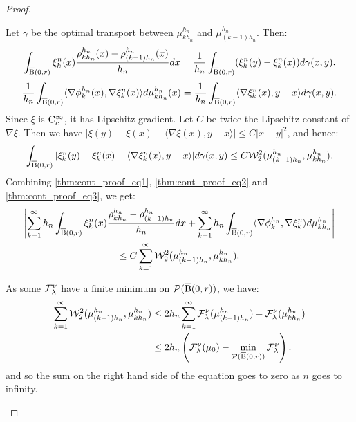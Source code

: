\begin{proof}
\begin{enumerate}[wide, labelwidth=!, labelindent=0pt,label=(\arabic*)]
Let $\gamma$ be the optimal transport between $\mu_{kh_n}^{h_n}$ and $\mu_{(k-1)h_n}^{h_n}$. Then:
\begin{equation} \label{thm:cont_proof_eq1}
\int_{\operatorname{\overline{B}}(0,r)} \xi_k^n(x) \frac{\rho_{kh_n}^{h_n}(x) - \rho_{(k-1)h_n}^{h_n}(x)}{h_n} dx = \frac{1}{h_n} \int_{\operatorname{\overline{B}}(0,r)} (\xi_k^n(y) - \xi_k^n(x)) d\gamma(x,y).
\end{equation}
\begin{equation} \label{thm:cont_proof_eq2}
\frac{1}{h_n}\int_{\operatorname{\overline{B}}(0,r)} \langle \nabla \phi_k^{h_n}(x) , \nabla \xi_k^n(x) \rangle d\mu_{kh_n}^{h_n}(x)  = \frac{1}{h_n} \int_{\operatorname{\overline{B}}(0,r)} \langle \nabla \xi_k^n(x), y-x \rangle d\gamma(x,y). 
\end{equation}
Since $\xi$ is $\mathrm{C}_c^{\infty}$, it has Lipschitz gradient. Let $C$ be twice the Lipschitz constant of $\nabla \xi$. Then we have $| \xi(y) - \xi(x) - \langle \nabla \xi(x), y-x \rangle | \leq C|x- y|^2$, and hence:
\begin{equation} \label{thm:cont_proof_eq3}
\int_{\operatorname{\overline{B}}(0,r)} |\xi_k^n(y) - \xi_k^n(x) - \langle \nabla \xi_k^n(x), y-x \rangle | d \gamma(x,y) \leq C{\cal W}_2^2( \mu_{(k-1)h_n}^{h_n}, \mu_{kh_n}^{h_n}).
\end{equation}
Combining \eqref{thm:cont_proof_eq1}, \eqref{thm:cont_proof_eq2} and \eqref{thm:cont_proof_eq3}, we get:
\begin{multline} \label{thm:cont_proof_eq4}
\left|\sum_{k=1}^{\infty} h_n \int_{\operatorname{\overline{B}}(0,r)} \xi_k^n(x) \frac{\rho_{kh_n}^{h_n} - \rho_{(k-1)h_n}^{h_n}}{h_n} dx  + 
\sum_{k=1}^{\infty} h_n\int_{\operatorname{\overline{B}}(0,r)} \langle \nabla \phi_k^{h_n} , \nabla \xi_k^n \rangle d\mu_{kh_n}^{h_n} \right| \\
\leq C\sum_{k=1}^{\infty} {\cal W}_2^2(\mu_{(k-1)h_n}^{h_n}, \mu_{kh_n}^{h_n}).
\end{multline}

As  some $\mathcal{F}^{\nu}_{\lambda}$ have a finite minimum on $\mathcal{P}(\operatorname{\overline{B}}(0,r))$, we have:
\begin{equation} \label{thm:cont_proof_eq5}
\begin{aligned}
\sum_{k=1}^{\infty} {\cal W}_2^2(\mu_{(k-1)h_n}^{h_n}, \mu_{kh_n}^{h_n}) & \leq  2 h_n \sum_{k=1}^{\infty} \mathcal{F}^{\nu}_{\lambda}(\mu_{(k-1)h_n}^{h_n}) - \mathcal{F}^{\nu}_{\lambda}(\mu_{kh_n}^{h_n}) \\ & \leq 2h_n \left(\mathcal{F}^{\nu}_{\lambda}(\mu_0) - \min_{\mathcal{P}(\operatorname{\overline{B}}(0,r))}\mathcal{F}^{\nu}_{\lambda} \right).
\end{aligned}
\end{equation}
and so the sum on the right hand side of the equation goes to zero as $n$ goes to infinity.


\end{enumerate}
\end{proof}
